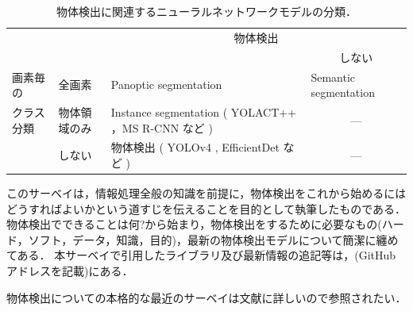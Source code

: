 \documentclass[originalpaper,fleqn]{jsaiart}     %
\begin{document}
\begin{table}
    \caption{物体検出に関連するニューラルネットワークモデルの分類．}
    \label{tbl-select-l}
    \begin{center}
        \setlength{\doublerulesep}{0.5pt}
        \begin{tabularx}{\linewidth}{|p{1.7cm}|p{1.0cm}||X|p{3.3cm}|} \hline
            \multicolumn{2}{|c||}{} & \multicolumn{2}{c|}{物体検出} \\ \cline{3-4}
            \multicolumn{2}{|l||}{} & \centering{する} & \multicolumn{1}{c|}{しない} \\ \hline\hline
            画素毎の & 全画素 & Panoptic segmentation \cite{KHGRD19} & Semantic segmentation \\ \cline{2-4}
            クラス分類 & 物体領域のみ  & Instance segmentation ( YOLACT++ \cite{BZXL20}，MS R-CNN \cite{HHGHW19} など ) &  \multicolumn{1}{c|}{---} \\ \cline{2-4}
            & しない & 物体検出 ( YOLOv4 \cite{BWL20}, EfficientDet \cite{TPL20} など ) & \multicolumn{1}{c|}{---} \\ 
            \hline
        \end{tabularx}
    \end{center}
\end{table}



このサーベイは，情報処理全般の知識を前提に，物体検出をこれから始めるにはどうすればよいかという道すじを伝えることを目的として執筆したものである．物体検出でできることは何?から始まり，物体検出をするために必要なもの(ハード，ソフト，データ，知識，目的)，最新の物体検出モデルについて簡潔に纏めてある．
本サーベイで引用したライブラリ及び最新情報の追記等は，(GitHubアドレスを記載)にある．

物体検出についての本格的な最近のサーベイは文献\cite{JZLYLFQ19}に詳しいので参照されたい．
\end{document}
